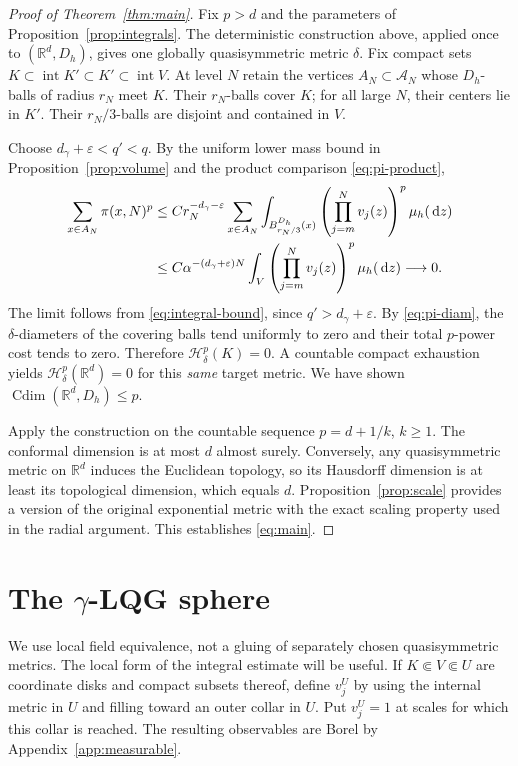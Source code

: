 \documentclass[11pt,reqno]{amsart}
\theoremstyle{plain}
\theoremstyle{definition}
\theoremstyle{remark}
\newcommand{\R}{\mathbb R}
\newcommand{\Hh}{\mathcal H}
\newcommand{\Cdim}{\operatorname{Cdim}}
\newcommand{\1}{\mathbf{1}}
\newcommand{\dd}{\,\mathrm d}
\newcommand{\bh}{B^{D_h}}
\begin{document}
\begin{proof}[Proof of Theorem~\ref{thm:main}]
Fix $p>d$ and the parameters of Proposition~\ref{prop:integrals}. The deterministic construction above, applied once to $(\R^d,D_h)$, gives one globally quasisymmetric metric $\delta$. Fix compact sets $K\subset\operatorname{int}K'\subset K'\subset\operatorname{int}V$. At level $N$ retain the vertices $A_N\subset\mathcal A_N$ whose $D_h$-balls of radius $r_N$ meet $K$. Their $r_N$-balls cover $K$; for all large $N$, their centers lie in $K'$. Their $r_N/3$-balls are disjoint and contained in $V$.

Choose $d_\gamma+\varepsilon<q'<q$. By the uniform lower mass bound in Proposition~\ref{prop:volume} and the product comparison \eqref{eq:pi-product},
\begin{align}\label{eq:covering-sum}
\sum_{x\in A_N}\pi(x,N)^p
&\le C r_N^{-d_\gamma-\varepsilon}
\sum_{x\in A_N}\int_{\bh_{r_N/3}(x)}\left(\prod_{j=m}^Nv_j(z)\right)^p\mu_h(\dd z)\\
&\le C\alpha^{-(d_\gamma+\varepsilon)N}
\int_V\left(\prod_{j=m}^Nv_j(z)\right)^p\mu_h(\dd z)\longrightarrow0.
\notag
\end{align}
The limit follows from \eqref{eq:integral-bound}, since $q'>d_\gamma+\varepsilon$. By \eqref{eq:pi-diam}, the $\delta$-diameters of the covering balls tend uniformly to zero and their total $p$-power cost tends to zero. Therefore $\Hh^p_\delta(K)=0$. A countable compact exhaustion yields $\Hh^p_\delta(\R^d)=0$ for this \emph{same} target metric. We have shown $\Cdim(\R^d,D_h)\le p$.

Apply the construction on the countable sequence $p=d+1/k$, $k\ge1$. The conformal dimension is at most $d$ almost surely. Conversely, any quasisymmetric metric on $\R^d$ induces the Euclidean topology, so its Hausdorff dimension is at least its topological dimension, which equals $d$. Proposition~\ref{prop:scale} provides a version of the original exponential metric with the exact scaling property used in the radial argument. This establishes \eqref{eq:main}.
\end{proof}

\section{The \texorpdfstring{$\gamma$}{gamma}-LQG sphere}\label{sec:spheres}
We use local field equivalence, not a gluing of separately chosen quasisymmetric metrics. The local form of the integral estimate will be useful. If $K\Subset V\Subset U$ are coordinate disks and compact subsets thereof, define $v_j^U$ by using the internal metric in $U$ and filling toward an outer collar in $U$. Put $v_j^U=1$ at scales for which this collar is reached. The resulting observables are Borel by Appendix~\ref{app:measurable}.
\end{document}
